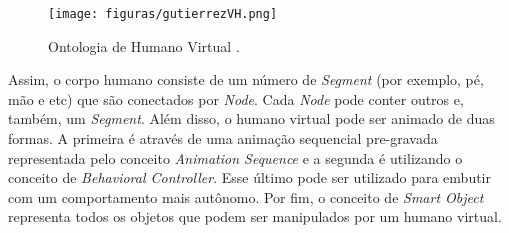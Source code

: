 \begin{figure}[t]
  \centering
    \texttt{[image: figuras/gutierrezVH.png]}
  \caption{Ontologia de Humano Virtual \cite{Gutierrez:2007:OVH:1229160.1229164}.}
  \label{fig:OVH}
\end{figure}

Assim, o corpo humano consiste de um número de \emph{Segment} (por exemplo,
pé, mão e etc) que são conectados por \emph{Node}. Cada \emph{Node} pode
conter outros e, também, um \emph{Segment}. Além disso, o humano virtual pode
ser animado de duas formas. A primeira é através de uma animação sequencial
pre-gravada representada pelo conceito \emph{Animation Sequence} e a segunda é
utilizando o conceito de \emph{Behavioral Controller}. Esse último pode ser
utilizado para embutir com um comportamento mais autônomo. Por fim, o conceito
de \emph{Smart Object} representa todos os objetos que podem ser manipulados por
um humano virtual.


